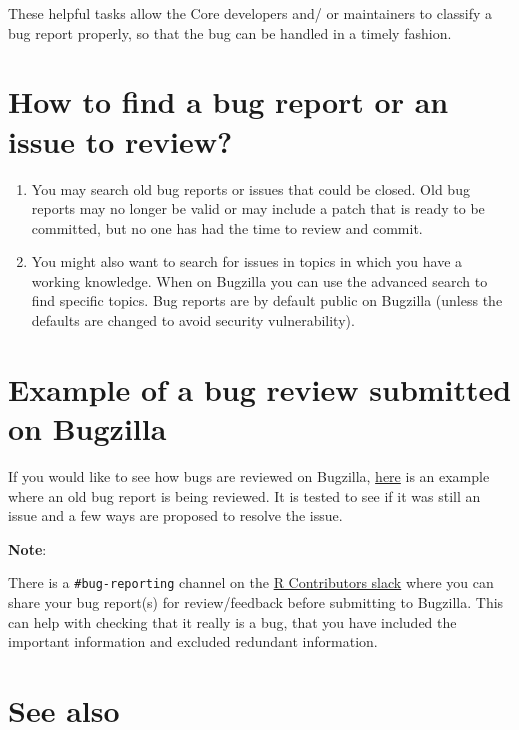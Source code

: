 \documentclass[
]{book}
\begin{document}
These helpful tasks allow the Core developers and/ or maintainers to classify a bug report properly, so that the bug can be handled in a timely fashion.

\hypertarget{how-to-find-a-bug-report-or-an-issue-to-review}{%
\section{How to find a bug report or an issue to review?}\label{how-to-find-a-bug-report-or-an-issue-to-review}}

\begin{enumerate}
\def\labelenumi{\arabic{enumi}.}
\item
  You may search old bug reports or issues that could be closed. Old bug reports may no longer be valid or may include a patch that is ready to be committed, but no one has had the time to review and commit.
\item
  You might also want to search for issues in topics in which you have a working knowledge. When on Bugzilla you can use the advanced search to find specific topics. Bug reports are by default public on Bugzilla (unless the defaults are changed to avoid security vulnerability).
\end{enumerate}

\hypertarget{example-of-a-bug-review-submitted-on-bugzilla}{%
\section{Example of a bug review submitted on Bugzilla}\label{example-of-a-bug-review-submitted-on-bugzilla}}

If you would like to see how bugs are reviewed on Bugzilla, \href{https://bugs.r-project.org/bugzilla/show_bug.cgi?id=16542}{here} is an example where an old bug report is being reviewed. It is tested to see if it was still an issue and a few ways are proposed to resolve the issue.

\textbf{Note}:

There is a \texttt{\#bug-reporting} channel on the \href{https://r-contributors.slack.com/}{R Contributors slack} where you can share your bug report(s) for review/feedback before submitting to Bugzilla. This can help with checking that it really is a bug, that you have included the important information and excluded redundant information.

\hypertarget{see-also-2}{%
\section{See also}\label{see-also-2}}
\end{document}
